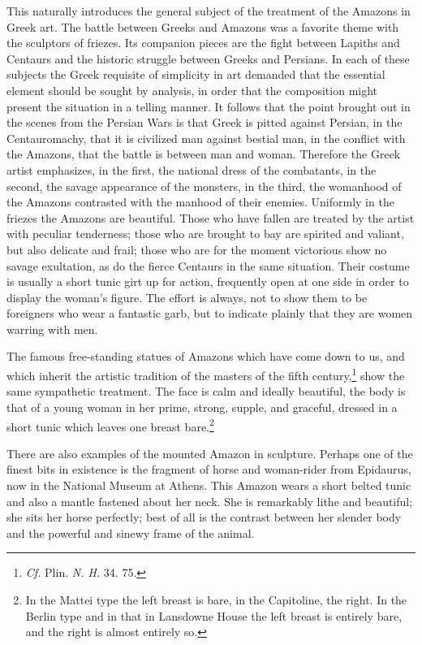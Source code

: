 \documentclass[a4paper, 12pt, oneside]{article}
\begin{document}
This naturally introduces the general subject of the treatment of the Amazons in Greek art. The battle between Greeks and Amazons was a favorite theme with the sculptors of friezes. Its companion pieces are the fight between Lapiths and Centaurs and the historic struggle between Greeks and Persians. In each of these subjects the Greek requisite of simplicity in art demanded that the essential element should be sought by analysis, in order that the composition might present the situation in a telling manner. It follows that the point brought out in the scenes from the Persian Wars is that Greek is pitted against Persian, in the Centauromachy, that it is civilized man against bestial man, in the conflict with the Amazons, that the battle is between man and woman. Therefore the Greek artist emphasizes, in the first, the national dress of the combatants, in the second, the savage appearance of the monsters, in the third, the womanhood of the Amazons contrasted with the manhood of their enemies. Uniformly in the friezes the Amazons are beautiful. Those who have fallen are treated by the artist with peculiar tenderness; those who are brought to bay are spirited and valiant, but also delicate and frail; those who are for the moment victorious show no savage exultation, as do the fierce Centaurs in the same situation. Their costume is usually a short tunic girt up for action, frequently open at one side in order to display the woman's figure. The effort is always, not to show them to be foreigners who wear a fantastic garb, but to indicate plainly that they are women warring with men.

The famous free-standing statues of Amazons which have come down to us, and which inherit the artistic tradition of the masters of the fifth century,\footnote{\emph{Cf.} Plin. \emph{N. H.} 34. 75.} show the same sympathetic treatment. The face is calm and ideally beautiful, the body is that of a young woman in her prime, strong, supple, and graceful, dressed in a short tunic which leaves one breast bare.\footnote{In the Mattei type the left breast is bare, in the Capitoline, the right. In the Berlin type and in that in Lansdowne House the left breast is entirely bare, and the right is almost entirely so.}

There are also examples of the mounted Amazon in sculpture. Perhaps one of the finest bits in existence is the fragment of horse and woman-rider from Epidaurus, now in the National Museum at Athens. This Amazon wears a short belted tunic and also a mantle fastened about her neck. She is remarkably lithe and beautiful; she sits her horse perfectly; best of all is the contrast between her slender body and the powerful and sinewy frame of the animal.
\end{document}
